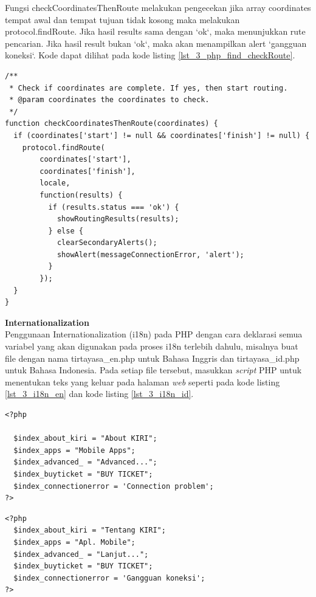 \documentclass[a4paper,twoside]{article}
\begin{document}
\begin{enumerate}
Fungsi checkCoordinatesThenRoute melakukan pengecekan jika array coordinates tempat awal dan tempat tujuan tidak kosong maka melakukan protocol.findRoute. Jika hasil results sama dengan `ok`, maka menunjukkan rute pencarian. Jika hasil result bukan `ok`, maka akan menampilkan alert `gangguan koneksi`. Kode dapat dilihat pada kode listing \ref{lst_3_php_find_checkRoute}.
\begin{lstlisting}[caption=Fungsi JavaScript checkCoordinatesThenRoute,label = {lst_3_php_find_checkRoute}]
/**
 * Check if coordinates are complete. If yes, then start routing.
 * @param coordinates the coordinates to check.
 */
function checkCoordinatesThenRoute(coordinates) {
  if (coordinates['start'] != null && coordinates['finish'] != null) {
    protocol.findRoute(
        coordinates['start'],
        coordinates['finish'],
        locale,
        function(results) {
          if (results.status === 'ok') {
            showRoutingResults(results);
          } else {
            clearSecondaryAlerts();
            showAlert(messageConnectionError, 'alert');
          }
        });
  }
}
\end{lstlisting}

\textbf{Internationalization}\\
Penggunaan Internationalization (i18n) pada PHP dengan cara deklarasi semua variabel yang akan digunakan pada proses i18n terlebih dahulu, misalnya buat file dengan nama tirtayasa\_en.php untuk Bahasa Inggris dan tirtayasa\_id.php untuk Bahasa Indonesia. Pada setiap file tersebut, masukkan \textit{script} PHP untuk menentukan teks yang keluar pada halaman \textit{web} seperti pada kode listing \ref{lst_3_i18n_en} dan kode listing \ref{lst_3_i18n_id}. 

\begin{lstlisting}[caption=Script PHP untuk Bahasa Inggris,label = {lst_3_i18n_en}]
<?php

  $index_about_kiri = "About KIRI";
  $index_apps = "Mobile Apps";
  $index_advanced_ = "Advanced...";
  $index_buyticket = "BUY TICKET";
  $index_connectionerror = 'Connection problem';
?>
\end{lstlisting}


\begin{lstlisting}[caption=Script PHP untuk Bahasa Indonesia,label = {lst_3_i18n_id}]
<?php
  $index_about_kiri = "Tentang KIRI";
  $index_apps = "Apl. Mobile";
  $index_advanced_ = "Lanjut...";
  $index_buyticket = "BUY TICKET";
  $index_connectionerror = 'Gangguan koneksi';
?>
\end{lstlisting}


\end{enumerate}
\end{document}
